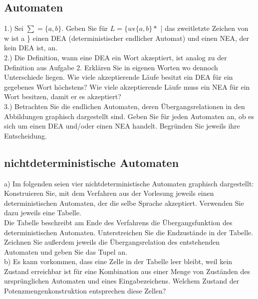 \documentclass[paper=a4, fontsize=11pt]{scrartcl}
\numberwithin{equation}{section}
\numberwithin{figure}{section}
\numberwithin{table}{section}
\begin{document}
\subsection{Automaten}

1.) Sei $\sum = \{ a,b \}$. Geben Sie für $L = \{ w \epsilon \{ a,b \} * $ | das zweitletzte Zeichen von w ist a \} einen DEA (deterministischer endlicher Automat) und einen NEA, der kein DEA ist, an. \\

2.) Die Definition, wann eine DEA ein Wort akzeptiert, ist analog zu der Definition aus Aufgabe 2. Erklären Sie in eigenen Worten wo dennoch Unterschiede liegen. Wie viele akzeptierende Läufe besitzt ein DEA für ein gegebenes Wort höchstens? Wie viele akzeptierende Läufe muss ein NEA für ein Wort besitzen, damit er es akzeptiert? \\

3.) Betrachten Sie die endlichen Automaten, deren Übergangsrelationen in den Abbildungen graphisch dargestellt sind. Geben Sie für jeden Automaten an, ob es sich um einen DEA und/oder einen NEA handelt. Begründen Sie jeweils ihre Entscheidung. \\


\subsection{nichtdeterministische Automaten}

a) Im folgenden seien vier nichtdeterministische  Automaten graphisch dargestellt: \\

Konstruieren Sie, mit dem Verfahren aus der Vorlesung jeweils einen deterministischen Automaten, der die selbe Sprache akzeptiert. Verwenden Sie dazu jeweils eine Tabelle. \\

Die Tabelle beschreibt am Ende des Verfahrens die Übergangsfunktion des deterministischen Automaten. Unterstreichen Sie die Endzustände in der Tabelle. Zeichnen Sie außerdem jeweils die Übergangsrelation des entstehenden Automaten und geben Sie das Tupel an. \\

b) Es kann vorkommen, dass eine Zelle in der Tabelle leer bleibt, weil kein Zustand erreichbar ist für eine Kombination aus einer Menge von Zuständen des ursprünglichen Automaten und eines Eingabezeichens. Welchem Zustand der Potenzmengenkonstruktion entsprechen diese Zellen? \\
\end{document}

